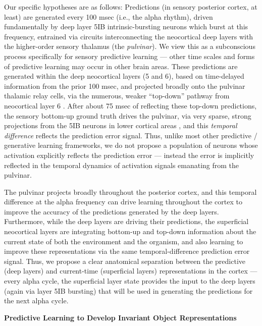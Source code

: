 \documentclass[10pt,twocolumn]{article}
\newif\myifpdf
\begin{document}
Our specific hypotheses are as follows: Predictions (in sensory posterior cortex, at least) are generated every 100 msec (i.e., the alpha rhythm), driven fundamentally by deep layer 5IB intrinsic-bursting neurons which burst at this frequency, entrained via circuits interconnecting the neocortical deep layers with the higher-order sensory thalamus (the {\em pulvinar}).  We view this as a subconscious process specifically for sensory predictive learning --- other time scales and forms of predictive learning may occur in other brain areas.  These predictions are generated within the deep neocortical layers (5 and 6), based on time-delayed information from the prior 100 msec, and projected broadly onto the pulvinar thalamic relay cells, via the numerous, weaker ``top-down'' pathway from neocortical layer 6 \cite{ShermanGuillery06}.  After about 75 msec of reflecting these top-down predictions, the sensory bottom-up ground truth drives the pulvinar, via very sparse, strong projections from the 5IB neurons in lower cortical areas \cite{ShermanGuillery06}, and this {\em temporal difference} reflects the prediction error signal.  Thus, unlike most other predictive / generative learning frameworks, we do not propose a population of neurons whose activation explicitly reflects the prediction error --- instead the error is implicitly reflected in the temporal dynamics of activation signals emanating from the pulvinar.

The pulvinar projects broadly throughout the posterior cortex, and this temporal difference at the alpha frequency can drive learning throughout the cortex to improve the accuracy of the predictions generated by the deep layers.  Furthermore, while the deep layers are driving their predictions, the superficial neocortical layers are integrating bottom-up and top-down information about the current state of both the environment and the organism, and also learning to improve these representations via the same temporal-difference prediction error signal.  Thus, we propose a clear anatomical separation between the predictive (deep layers) and current-time (superficial layers) representations in the cortex --- every alpha cycle, the superficial layer state provides the input to the deep layers (again via layer 5IB bursting) that will be used in generating the predictions for the next alpha cycle.

\begin{center}
\textbf{Predictive Learning to Develop Invariant Object Representations}
\end{center}
\end{document}
